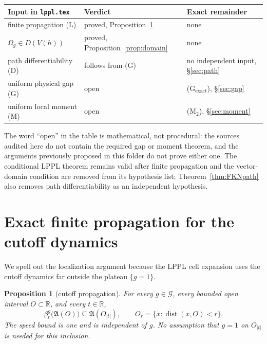 \documentclass[11pt,a4paper]{article}
\newtheorem{proposition}[theorem]{Proposition}
\theoremstyle{remark}
\newcommand{\R}{\mathbb R}
\newcommand{\A}{\mathfrak A}
\newcommand{\Om}{\Omega}
\newcommand{\G}{\mathcal G}
\DeclareMathOperator{\dist}{dist}
\begin{document}
\begin{center}
\begin{tabular}{@{}lll@{}}
\toprule
Input in \texttt{lppl.tex} & Verdict & Exact remainder\\
\midrule
finite propagation (L) & proved, Proposition~\ref{prop:propagation} & none\\
$\Om_g\in D(V(h))$ & proved, Proposition~\ref{prop:domain} & none\\
path differentiability (D) & follows from (G) & no independent input, \S\ref{sec:path}\\
uniform physical gap (G) & open & (G$_\mathrm{exact}$), \S\ref{sec:gap}\\
uniform local moment (M) & open & (M$_2$), \S\ref{sec:moment}\\
\bottomrule
\end{tabular}
\end{center}

The word ``open'' in the table is mathematical, not procedural: the sources audited here do not
contain the required gap or moment theorem, and the arguments previously proposed in this folder
do not prove either one.  The conditional LPPL theorem remains valid after finite propagation and
the vector-domain condition are removed from its hypothesis list; Theorem~\ref{thm:FKNpath} also
removes path differentiability as an independent hypothesis.

\section{Exact finite propagation for the cutoff dynamics}

We spell out the localization argument because the LPPL cell expansion uses the cutoff dynamics
far outside the plateau $\{g=1\}$.

\begin{proposition}[cutoff propagation]\label{prop:propagation}
For every $g\in\G$, every bounded open interval $O\subset\R$, and every $t\in\R$,
\[
 \beta_t^g\bigl(\A(O)\bigr)\subseteq\A(O_{|t|}),
 \qquad O_r=\{x:\dist(x,O)<r\}.
\]
The speed bound is one and is independent of $g$.  No assumption that $g=1$ on $O_{|t|}$ is
needed for this inclusion.
\end{proposition}
\end{document}
